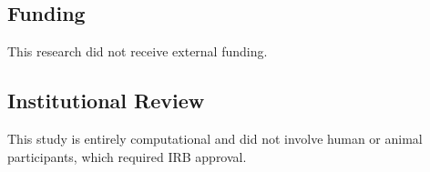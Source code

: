 \documentclass[entropy,article,submit,oneauthor,pdftex]{Definitions/mdpi}
\begin{document}
\subsection{Funding} 
This research did not receive external funding. 

\subsection{Institutional Review} 
This study is entirely computational and did not involve human or animal participants, which required IRB approval. 


%
%
\end{document}
